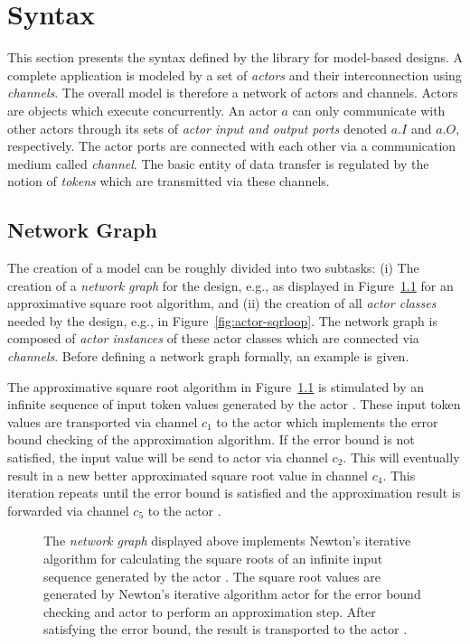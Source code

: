 \chapter{Syntax}

This section presents the syntax defined by the \SysteMoC{} library for model-based designs.
A complete application is modeled \SysteMoC{} by a set of \emph{actors} and their interconnection using \emph{channels}. 
The overall model is therefore a network of actors and channels.
Actors are objects which execute concurrently.
An actor $a$ can only communicate with other actors through its sets of \emph{actor input and output ports} denoted $a.I$ and $a.O$, respectively.
The actor ports are connected with each other via a communication medium called \emph{channel}.
The basic entity of data transfer is regulated by the notion of \emph{tokens} which are transmitted via these channels.

\section{Network Graph}
The creation of a \SysteMoC{} model can be roughly divided into two subtasks:
(i) The creation of a \emph{network graph} for the design, e.g., as displayed in Figure~\ref{fig:ng-sqrroot} for an approximative square root algorithm, and
(ii) the creation of all \emph{actor classes} needed by the design, e.g.,  in Figure~\ref{fig:actor-sqrloop}.
The network graph is composed of \emph{actor instances} of these actor classes which are connected via \emph{channels}.
Before defining a network graph formally, an example is given.

\begin{example}\label{ex:systemoc-networkgraph}%
The approximative square root algorithm in Figure~\ref{fig:ng-sqrroot} is stimulated by an infinite sequence of input token values generated by the actor .
These input token values are transported via channel $c_1$ to the actor  which implements the error bound checking of the approximation algorithm.
If the error bound is not satisfied, the input value will be send to actor  via channel $c_2$. 
This will eventually result in a new better approximated square root value in channel $c_4$.
This iteration repeats until the error bound is satisfied and the approximation result is forwarded via channel $c_5$ to the actor .
\begin{figure}
\centering
\resizebox{\textwidth}{!}{}
\caption{\label{fig:ng-sqrroot}%
The \emph{network graph} displayed above implements Newton's iterative algorithm for calculating the square roots of an infinite input sequence generated by the actor .
The square root values are generated by Newton's iterative algorithm actor  for the error bound checking and actor  to perform an approximation step.
After satisfying the error bound, the result is transported to the actor .}
\end{figure}
\end{example}

